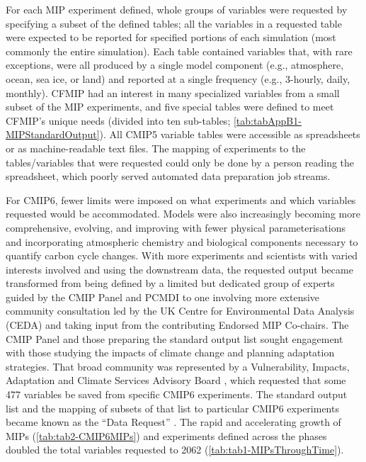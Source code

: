 \documentclass[manuscript]{copernicus}
\begin{document}
For each MIP experiment defined, whole groups of variables were requested by specifying a subset of the defined tables; all the variables in a requested table were expected to be reported for specified portions of each simulation (most commonly the entire simulation). Each table contained variables that, with rare exceptions, were all produced by a single model component (e.g., atmosphere, ocean, sea ice, or land) and reported at a single frequency (e.g., 3-hourly, daily, monthly). CFMIP had an interest in many specialized variables from a small subset of the MIP experiments, and five special tables were defined to meet CFMIP's unique needs (divided into ten sub-tables; \autoref{tab:tabAppB1-MIPStandardOutput}). All CMIP5 variable tables were accessible as spreadsheets or as machine-readable text files. The mapping of experiments to the tables/variables that were requested could only be done by a person reading the spreadsheet, which poorly served automated data preparation job streams.

For CMIP6, fewer limits were imposed on what experiments and which variables requested would be accommodated. Models were also increasingly becoming more comprehensive, evolving, and improving with fewer physical parameterisations and incorporating atmospheric chemistry and biological components necessary to quantify carbon cycle changes. With more experiments and scientists with varied interests involved and using the downstream data, the requested output became transformed from being defined by a limited but dedicated group of experts guided by the CMIP Panel and PCMDI to one involving more extensive community consultation led by the UK Centre for Environmental Data Analysis (CEDA) and taking input from the contributing Endorsed MIP Co-chairs. The CMIP Panel and those preparing the standard output list sought engagement with those studying the impacts of climate change and planning adaptation strategies. That broad community was represented by a Vulnerability, Impacts, Adaptation and Climate Services Advisory Board \citep[VIACS AB;][]{ruane_vulnerability_2016}, which requested that some 477 variables be saved from specific CMIP6 experiments. The standard output list and the mapping of subsets of that list to particular CMIP6 experiments became known as the ``Data Request'' \citep{juckes_cmip6_2020}. The rapid and accelerating growth of MIPs (\autoref{tab:tab2-CMIP6MIPs}) and experiments defined across the phases doubled the total variables requested to 2062 (\autoref{tab:tab1-MIPsThroughTime}). 
\end{document}
